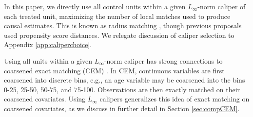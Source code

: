 \documentclass{article}
\begin{document}
In this paper, we directly use all control units within a given $L_\infty$-norm caliper of each treated unit, maximizing the number of local matches used to produce causal estimates.
This is known as radius matching \citep{dehejia2002propensity}, though previous proposals used propensity score distances.
We relegate discussion of caliper selection to Appendix \ref{app:caliperchoice}.

Using all units within a given $L_\infty$-norm caliper has strong connections to coarsened exact matching (CEM) \citep{iacus2012causal}.
In CEM, continuous variables are first coarsened into discrete bins, e.g., an age variable may be coarsened into the bins 0-25, 25-50, 50-75, and 75-100.
Observations are then exactly matched on their coarsened covariates.
Using $L_\infty$ calipers generalizes this idea of exact matching on coarsened covariates, as we discuss in further detail in Section \ref{sec:compCEM}.

\end{document}
